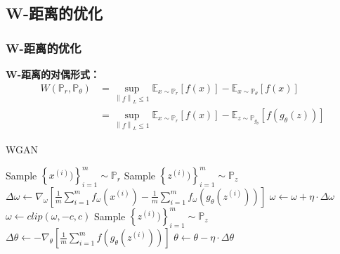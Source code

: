 \documentclass[xelatex]{beamer}
\begin{document}
\subsection{W-距离的优化}

\begin{frame}
\frametitle{W-距离的优化}
\textbf{W-距离的对偶形式：}
\begin{equation*}
  \begin{split}
    \mathit{W}(\mathbb{P}_r , \mathbb{P}_\theta) &= \sup_{\left \| f \right \|_{L} \leq 1} \mathbb{E}_{x \sim \mathbb{P}_r} \left [ f(x) \right ] - \mathbb{E}_{x \sim \mathbb{P}_\theta} \left [ f(x) \right ] \\
    &= \sup_{\left \| f \right \|_{L} \leq 1} \mathbb{E}_{x \sim \mathbb{P}_r} \left [ f(x) \right ] - \mathbb{E}_{z \sim \mathbb{P}_{g_\theta}} \left [ f(g_\theta(z)) \right ]
  \end{split}
\end{equation*}

\begin{algorithm}[H]
  \caption{WGAN}
  \begin{algorithmic}
    \STATE Sample $\left \{ x^{(i)}) \right \}^m_{i=1} \sim \mathbb{P}_r$
    \STATE Sample $\left \{ z^{(i)}) \right \}^m_{i=1} \sim \mathbb{P}_z$
    \STATE $\Delta \omega \leftarrow \nabla_{\omega} \left [ \frac{1}{m}\sum_{i=1}^{m} f_{\omega }(x^{(i)}) - \frac{1}{m}\sum_{i=1}^{m} f_{\omega }(g_\theta(z^{(i)})) \right ]$
    \STATE $\omega \leftarrow \omega + \eta \cdot \Delta \omega$
    \STATE $\omega \leftarrow clip(\omega, -c ,c)$
    \STATE Sample $\left \{ z^{(i)}) \right \}^m_{i=1} \sim \mathbb{P}_z$
    \STATE $\Delta \theta \leftarrow  - \nabla_{\theta} \left [\frac{1}{m}\sum_{i=1}^{m} f(g_\theta(z^{(i)})) \right ]$
    \STATE $\theta \leftarrow \theta - \eta \cdot \Delta \theta$
  \end{algorithmic}
\end{algorithm}
\end{frame}
\end{document}
